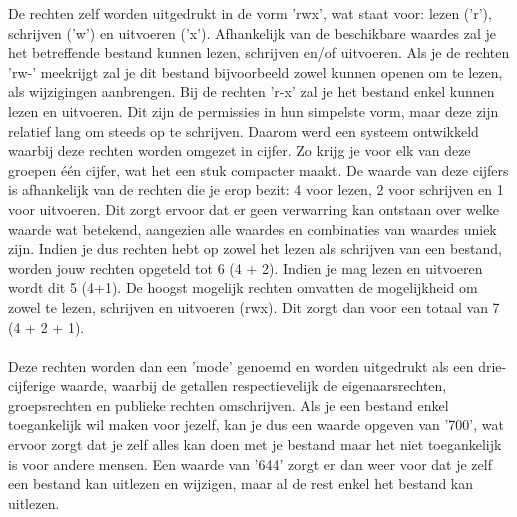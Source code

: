 De rechten zelf worden uitgedrukt in de vorm 'rwx', wat staat voor: lezen ('r'), schrijven ('w') en uitvoeren ('x'). Afhankelijk van de beschikbare waardes zal je het betreffende bestand kunnen lezen, schrijven en/of uitvoeren. Als je de rechten 'rw-' meekrijgt zal je dit bestand bijvoorbeeld zowel kunnen openen om te lezen, als wijzigingen aanbrengen. Bij de rechten 'r-x' zal je het bestand enkel kunnen lezen en uitvoeren. Dit zijn de permissies in hun simpelste vorm, maar deze zijn relatief lang om steeds op te schrijven. Daarom werd een systeem ontwikkeld waarbij deze rechten worden omgezet in cijfer. Zo krijg je voor elk van deze groepen \'e\'en cijfer, wat het een stuk compacter maakt. De waarde van deze cijfers is afhankelijk van de rechten die je erop bezit: 4 voor lezen, 2 voor schrijven en 1 voor uitvoeren. Dit zorgt ervoor dat er geen verwarring kan ontstaan over welke waarde wat betekend, aangezien alle waardes en combinaties van waardes uniek zijn. Indien je dus rechten hebt op zowel het lezen als schrijven van een bestand, worden jouw rechten opgeteld tot 6 (4 + 2). Indien je mag lezen en uitvoeren wordt dit 5 (4+1). De hoogst mogelijk rechten omvatten de mogelijkheid om zowel te lezen, schrijven en uitvoeren (rwx). Dit zorgt dan voor een totaal van 7 (4 + 2 + 1).\\\\
Deze rechten worden dan een 'mode' genoemd en worden uitgedrukt als een drie-cijferige waarde, waarbij de getallen respectievelijk de eigenaarsrechten, groepsrechten en publieke rechten omschrijven. Als je een bestand enkel toegankelijk wil maken voor jezelf, kan je dus een waarde opgeven van '700', wat ervoor zorgt dat je zelf alles kan doen met je bestand maar het niet toegankelijk is voor andere mensen. Een waarde van '644' zorgt er dan weer voor dat je zelf een bestand kan uitlezen en wijzigen, maar al de rest enkel het bestand kan uitlezen. 
